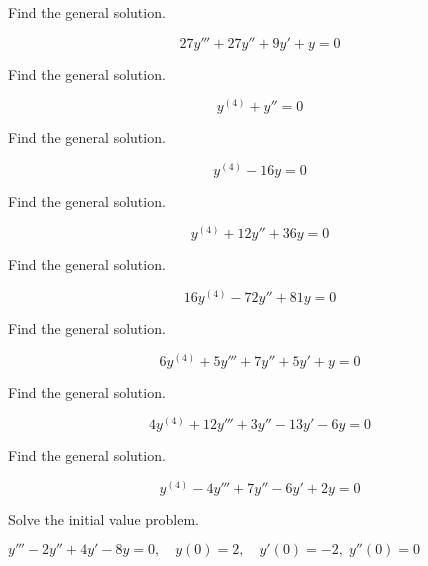 \documentclass{ximera}
\begin{document}
\begin{problem}\label{exer:9.2.7} Find the general solution.

$$27y'''+27y''+9y'+y=0$$

\end{problem}


\begin{problem}\label{exer:9.2.8} Find the general solution.

$$y^{(4)}+y''=0$$

\end{problem}

 \begin{problem}\label{exer:9.2.9}  Find the general solution.

$$y^{(4)}-16y=0$$

\end{problem}


\begin{problem}\label{exer:9.2.10} Find the general solution.

$$y^{(4)}+12y''+36y=0$$
\end{problem}



\begin{problem}\label{exer:9.2.11} Find the general solution.

$$16y^{(4)}-72y''+81y=0$$

\end{problem}

\begin{problem}\label{exer:9.2.12} Find the general solution.

$$6y^{(4)}+5y'''+7y''+5y'+y=0$$

\end{problem}


\begin{problem}\label{exer:9.2.13}  Find the general solution.

$$4y^{(4)}+12y'''+3y''-13y'-6y=0$$
\end{problem}


\begin{problem}\label{exer:9.2.14}  Find the general solution.

$$y^{(4)}-4y'''+7y''-6y'+2y=0$$

\end{problem}


\begin{problem}\label{exer:9.2.15}
Solve the
initial value problem.

$y'''-2y''+4y'-8y=0, \quad  y(0)=2,\quad y'(0)=-2,\;  y''(0)=0$
\end{problem}
\end{document}
